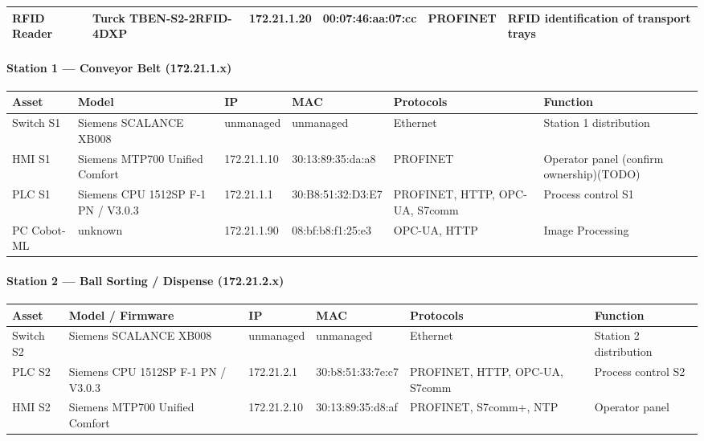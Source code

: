 \documentclass{report}
\begin{document}
{\begin{longtable}{L{2cm} L{2.1cm} L{2.1cm} L{2.6cm} L{2.4cm} L{4cm}}
    RFID Reader & Turck TBEN-S2-2RFID-4DXP & 172.21.1.20 &
    00:07:46:aa:07:cc & PROFINET & RFID identification of transport trays \\
\bottomrule
\end{longtable}


\paragraph{Station 1 --- Conveyor Belt (172.21.1.x)}
\begin{longtable}{L{2cm} L{2.1cm} L{2.1cm} L{2.6cm} L{2.4cm} L{4cm}}
\toprule
\textbf{Asset} & \textbf{Model} & \textbf{IP} & \textbf{MAC} & \textbf{Protocols} & \textbf{Function} \\
\midrule \endhead
    Switch S1 & Siemens SCALANCE XB008 & unmanaged & unmanaged & Ethernet &
    Station 1 distribution \\

    HMI S1 & Siemens MTP700 Unified Comfort & 172.21.1.10 & 30:13:89:35:da:a8 &
    PROFINET & Operator panel (confirm ownership)(TODO) \\

    PLC S1 & Siemens CPU 1512SP F-1 PN / V3.0.3 & 172.21.1.1 &
    30:B8:51:32:D3:E7 & PROFINET, HTTP, OPC-UA, S7comm & Process control S1 \\

    PC Cobot-ML & unknown & 172.21.1.90 & 08:bf:b8:f1:25:e3 & OPC-UA, HTTP &
    Image Processing \\
\bottomrule
\end{longtable}

\paragraph{Station 2 --- Ball Sorting / Dispense (172.21.2.x)}
\begin{longtable}{L{2cm} L{2.1cm} L{2.1cm} L{2.6cm} L{2.4cm} L{4cm}}
\toprule
\textbf{Asset} & \textbf{Model / Firmware} & \textbf{IP} & \textbf{MAC} & \textbf{Protocols} & \textbf{Function} \\
\midrule \endhead
    Switch S2 & Siemens SCALANCE XB008 & unmanaged & unmanaged & Ethernet &
    Station 2 distribution \\

    PLC S2 & Siemens CPU 1512SP F-1 PN / V3.0.3 & 172.21.2.1 & 30:b8:51:33:7e:c7 & PROFINET, HTTP, OPC-UA, S7comm & Process control S2 \\

    HMI S2 & Siemens MTP700 Unified Comfort & 172.21.2.10 & 30:13:89:35:d8:af &
    PROFINET, S7comm+, NTP & Operator panel \\


\end{longtable}}
\end{document}
